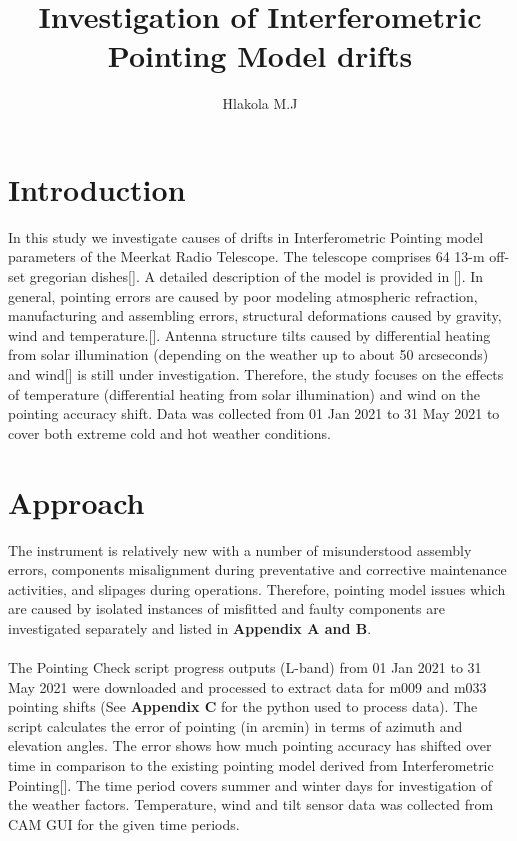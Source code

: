 \documentclass{article}
\title{ Investigation of Interferometric Pointing Model drifts }
\author{Hlakola M.J }
\date{}
\begin{document}
\maketitle

\section{Introduction}
In this study we investigate causes of drifts in Interferometric Pointing model parameters of the Meerkat Radio Telescope. The telescope comprises 64 13-m off-set gregorian dishes[\cite{Tony}].  A detailed description of the model is  provided in [\cite{Tony}]. In general, pointing errors are caused by poor modeling atmospheric refraction, manufacturing and assembling errors, structural deformations caused by gravity, wind and temperature.[\cite{Bayley}].  Antenna structure tilts caused by differential heating from solar illumination (depending on the weather up to
about 50 arcseconds) and wind[\cite{Tony}] is still under investigation. Therefore, the study focuses on the effects of temperature (differential heating from solar illumination) and wind on the pointing accuracy shift.  Data was collected from 01 Jan 2021 to 31 May 2021 to cover both extreme cold and hot weather conditions.  

\section{Approach}

The instrument is relatively new with a number of misunderstood assembly errors, components misalignment during preventative and corrective maintenance activities, and slipages during operations.  Therefore, pointing model issues which are caused by isolated instances of misfitted and faulty components are investigated separately and listed in \textbf{Appendix A and B}.   \\
\\
The Pointing Check script progress outputs (L-band) from 01 Jan 2021 to 31 May 2021 were downloaded and processed to extract data for m009 and m033 pointing shifts (See \textbf{Appendix C} for the python used to process data).  The script calculates the error of pointing (in arcmin) in terms of azimuth and elevation angles.  The error shows how much pointing accuracy has shifted over time in comparison to the existing pointing model derived from Interferometric Pointing[\cite{Tony}].  The time period covers summer and winter days for investigation of the weather factors.  Temperature, wind and tilt sensor data was collected from CAM GUI for the given time periods. \\
\end{document}
